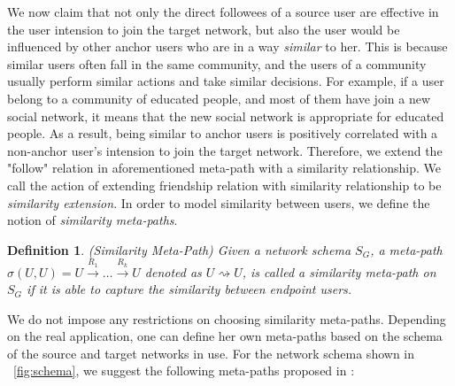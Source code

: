 \documentclass[conference]{IEEEtran}
\newtheorem{definition}{Definition}[section]
\begin{document}
We now claim that not only the direct followees of a source user are effective in the user intension to join the target network, but also the user would be influenced by other anchor users who are in a way \textit{similar} to her. This is because similar users often fall in the same community, and the users of a community usually perform similar actions and take similar decisions. For example, if a user belong to a community of educated people, and most of them have join a new social network, it means that the new social network is appropriate for educated people. As a result, being similar to anchor users is positively correlated with a non-anchor user's intension to join the target network. Therefore, we extend the "follow" relation in aforementioned meta-path with a similarity relationship. We call the action of extending friendship relation with similarity relationship to be \textit{similarity extension}. In order to model similarity between users, we define the notion of \textit{similarity meta-paths}.

\begin{definition}{(Similarity Meta-Path)}
Given a network schema $S_G$, a meta-path $\sigma(U,U) = U\xrightarrow{R_1}\dots\xrightarrow{R_k}U$ denoted as $U\rightsquigarrow U$, is called a similarity meta-path on $S_G$ if it is able to capture the similarity between endpoint users.
\end{definition}


We do not impose any restrictions on choosing similarity meta-paths. Depending on the real application, one can define her own meta-paths based on the schema of the source and target networks in use. For the network schema shown in \figurename~\ref{fig:schema}, we suggest the following meta-paths proposed in \cite{zhang2014meta}:
\end{document}
